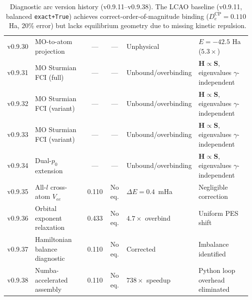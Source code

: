 \documentclass[aps,pra,twocolumn,superscriptaddress,longbibliography]{revtex4-2}
\begin{document}
\begin{table}[t]
\begin{tabular}{llccll}
v0.9.30 & MO-to-atom projection
  & --- & --- & Unphysical & $E=-42.5$ Ha ($5.3\times$) \\
v0.9.31 & MO Sturmian FCI (full)
  & --- & --- & Unbound/overbinding & $\mathbf{H}\!\propto\!\mathbf{S}$, eigenvalues $\gamma$-independent \\
v0.9.32 & MO Sturmian FCI (variant)
  & --- & --- & Unbound/overbinding & $\mathbf{H}\!\propto\!\mathbf{S}$, eigenvalues $\gamma$-independent \\
v0.9.33 & MO Sturmian FCI (variant)
  & --- & --- & Unbound/overbinding & $\mathbf{H}\!\propto\!\mathbf{S}$, eigenvalues $\gamma$-independent \\
v0.9.34 & Dual-$p_0$ extension
  & --- & --- & Unbound/overbinding & $\mathbf{H}\!\propto\!\mathbf{S}$, eigenvalues $\gamma$-independent \\
v0.9.35 & All-$l$ cross-atom $V_{ee}$
  & 0.110 & No eq. & $\Delta E = 0.4$~mHa & Negligible correction \\
v0.9.36 & Orbital exponent relaxation
  & 0.433 & No eq. & $4.7\times$ overbind & Uniform PES shift \\
v0.9.37 & Hamiltonian balance diagnostic
  & 0.110 & No eq. & Corrected & Imbalance identified \\
v0.9.38 & Numba-accelerated assembly
  & 0.110 & No eq. & $738\times$ speedup & Python loop overhead eliminated \\
\bottomrule
\end{tabular}
\caption{Diagnostic arc version history (v0.9.11--v0.9.38).
The LCAO baseline (v0.9.11, balanced \texttt{exact+True}) achieves
correct-order-of-magnitude binding ($D_e^{\mathrm{CP}} = 0.110$~Ha,
20\% error) but lacks equilibrium geometry due to missing kinetic
repulsion.}
\label{tab:versions}
\end{table}

\end{document}
